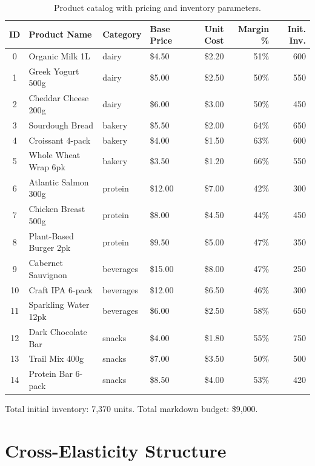 \documentclass[11pt,a4paper]{article}
\begin{document}
\begin{table}[H]
\centering
\caption{Product catalog with pricing and inventory parameters.}
\small
\begin{tabular}{@{}clllrrr@{}}
\toprule
\textbf{ID} & \textbf{Product Name} & \textbf{Category} & \textbf{Base Price} & \textbf{Unit Cost} & \textbf{Margin \%} & \textbf{Init. Inv.} \\
\midrule
0  & Organic Milk 1L         & dairy     & \$4.50  & \$2.20 & 51\% & 600 \\
1  & Greek Yogurt 500g       & dairy     & \$5.00  & \$2.50 & 50\% & 550 \\
2  & Cheddar Cheese 200g     & dairy     & \$6.00  & \$3.00 & 50\% & 450 \\
3  & Sourdough Bread         & bakery    & \$5.50  & \$2.00 & 64\% & 650 \\
4  & Croissant 4-pack        & bakery    & \$4.00  & \$1.50 & 63\% & 600 \\
5  & Whole Wheat Wrap 6pk    & bakery    & \$3.50  & \$1.20 & 66\% & 550 \\
6  & Atlantic Salmon 300g    & protein   & \$12.00 & \$7.00 & 42\% & 300 \\
7  & Chicken Breast 500g     & protein   & \$8.00  & \$4.50 & 44\% & 450 \\
8  & Plant-Based Burger 2pk  & protein   & \$9.50  & \$5.00 & 47\% & 350 \\
9  & Cabernet Sauvignon      & beverages & \$15.00 & \$8.00 & 47\% & 250 \\
10 & Craft IPA 6-pack        & beverages & \$12.00 & \$6.50 & 46\% & 300 \\
11 & Sparkling Water 12pk    & beverages & \$6.00  & \$2.50 & 58\% & 650 \\
12 & Dark Chocolate Bar      & snacks    & \$4.00  & \$1.80 & 55\% & 750 \\
13 & Trail Mix 400g          & snacks    & \$7.00  & \$3.50 & 50\% & 500 \\
14 & Protein Bar 6-pack      & snacks    & \$8.50  & \$4.00 & 53\% & 420 \\
\bottomrule
\end{tabular}
\end{table}

Total initial inventory: 7,370 units. Total markdown budget: \$9,000.

\section{Cross-Elasticity Structure}
\label{sec:cross_elast}
\end{document}
